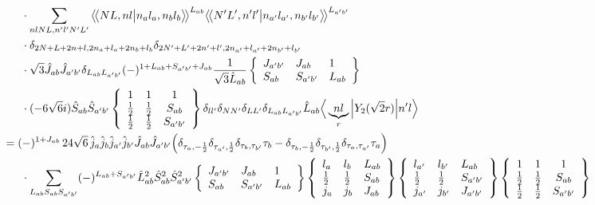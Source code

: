 \documentclass[master]{shnuthesis}
\newcommand{\llangle}{\big\langle\!\big\langle}
\newcommand{\rrangle}{\big\rangle\!\big\rangle}
\newcommand{\ap}{a^\prime}
\newcommand{\bp}{b^\prime}
\newcommand{\il}{\!\!\!\!\!\!\!\!\!\!}
\begin{document}
\begin{align}
    & \cdot \sum_{nlNL,n^\prime l^\prime N^\prime L^\prime} \llangle N L, n l \big| n_{a} l_{a}, n_{b} l_{b} \rrangle^{L_{ab}} \llangle N^\prime L^\prime, n^\prime l^\prime \big| n_{a^\prime} l_{a^\prime}, n_{b^\prime} l_{b^\prime} \rrangle^{L_{\ap\bp}} \notag\\
    & \cdot \delta_{2N+L+2n+l,2n_a+l_a+2n_b+l_b}\delta_{2N^\prime+L^\prime+2n^\prime+l^\prime,2n_{a^\prime}+l_{a^\prime}+2n_{b^\prime}+l_{b^\prime}}  \notag\\
    & \cdot \sqrt{3}\hat{J}_{ab}\hat{J}_{\ap\bp} \delta_{L_{ab}L_{\ap\bp}}(-)^{1+L_{ab}+S_{\ap\bp}+J_{ab}}\frac{1}{\sqrt{3}\hat{L}_{ab}}  \left\{\begin{array}{lll} J_{\ap\bp} & J_{ab} & 1 \\ S_{ab} & S_{\ap\bp} & L_{ab} \end{array}\right\}   \notag\\
    & \cdot (-6\sqrt{6}i) \hat{S}_{ab}\hat{S}_{\ap\bp}  \left\{\begin{array}{ccc} 1 & 1 & 1 \\ \frac{1}{2} & \frac{1}{2} & S_{ab} \\ \frac{1}{2} & \frac{1}{2} & S_{\ap\bp} \end{array}\right\}  \delta_{ll^\prime}\delta_{NN^\prime}\delta_{LL^\prime}\delta_{L_{ab}L_{\ap\bp}}  \hat{L}_{ab} \Big\langle \underbrace{n l}_{r} \Big| Y_2(\sqrt{2}r) \Big| n^\prime l \Big\rangle \\
    &\il = (-)^{1+J_{ab}}\,24\sqrt{6}\,\hat{j}_a\hat{j}_b\hat{j}_{\ap}\hat{j}_{\bp}\hat{J}_{ab}\hat{J}_{\ap\bp} \Big( \delta_{\tau_a,-\frac{1}{2}}\delta_{\tau_{\ap},\frac{1}{2}}\delta_{\tau_b,\tau_{\bp}}\tau_b - \delta_{\tau_b,-\frac{1}{2}}\delta_{\tau_{\bp},\frac{1}{2}}\delta_{\tau_a,\tau_{\ap}}\tau_a \Big) \notag\\
    & \cdot \sum_{L_{ab}S_{ab}S_{\ap\bp}} (-)^{L_{ab}+S_{\ap\bp}} \hat{L}_{ab}^2\hat{S}_{ab}^2\hat{S}_{\ap\bp}^2  \left\{\begin{array}{lll} J_{\ap\bp} & J_{ab} & 1 \\ S_{ab} & S_{\ap\bp} & L_{ab} \end{array}\right\}  \left\{\begin{array}{lll}l_{a} & l_{b} & L_{ab} \\ \frac{1}{2} & \frac{1}{2} & S_{ab} \\j_{a} & j_{b} & J_{ab} \end{array}\right\} \left\{\begin{array}{lll}l_{\ap} & l_{\bp} & L_{ab} \\ \frac{1}{2} & \frac{1}{2} & S_{\ap\bp} \\j_{\ap} & j_{\bp} & J_{\ap\bp} \end{array}\right\}  \left\{\begin{array}{ccc} 1 & 1 & 1 \\ \frac{1}{2} & \frac{1}{2} & S_{ab} \\ \frac{1}{2} & \frac{1}{2} & S_{\ap\bp} \end{array}\right\}  \notag \\

\end{align}
\end{document}
